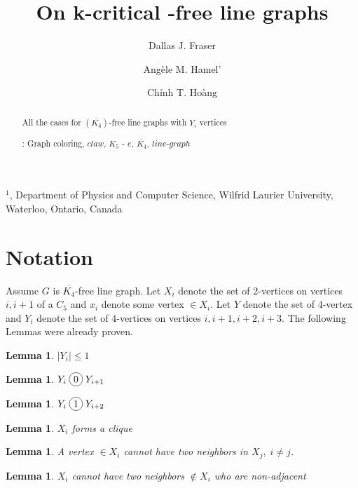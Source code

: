 \documentclass[12pt]{article}
\title{On k-critical {\FAM}-free line graphs}
\author{
	Dallas J. Fraser\inst{1}
	\and Ang\`ele M. Hamel'\inst{1}
	\and Ch\'inh T. Ho\`ang\inst{1}
}
\newcommand*\circled[1]{\tikz[baseline=(char.base)]{
            \node[shape=circle,draw,inner sep=2pt] (char) {#1};}}
\newtheorem{Lemma}[Theorem]{Lemma}
\def\inst#1{$^{#1}$}
\begin{document}
\maketitle

\begin{center}
{\footnotesize

\inst{1}, Department of Physics and Computer Science, Wilfrid Laurier
University, \\Waterloo, Ontario, Canada}

\end{center}

\begin{abstract}
All the cases for $(\overline{K_4})$-free line graphs with $Y_i$ vertices

: Graph coloring, $claw$, $K_5$ - $e$, $\overline{K_4}$, $line$-$graph$ 
\end{abstract}


\section{Notation}\label{sec:intro}
Assume $G$ is $\overline{K_4}$-free line graph. Let $X_i$ denote the set of $2$-vertices on vertices $i,i+1$ of a $C_5$ and $x_i$ denote some vertex $\in X_i$. Let $Y$ denote the set of $4$-vertex and $Y_i$ denote the set of $4$-vertices on vertices $i, i+1,i+2,i+3$. The following Lemmas were already proven.

\begin{Lemma}\label{lem:c5-4vertex-bounded}
$|Y_i| \leq 1$
\end{Lemma}

\begin{Lemma}\label{lem:yi-cojoin-yi1}
$Y_i \;\circled{0}\; Y_{i+1}$
\end{Lemma}

\begin{Lemma}\label{lem:yi-join-yi2}
$Y_i \;\circled{1}\; Y_{i+2}$
\end{Lemma}

\begin{Lemma}\label{lem:xi-clique}
$X_i$ forms a clique
\end{Lemma}

\begin{Lemma}\label{lem:2xi-cojoins-xj}
A vertex $\in X_i$ cannot have two neighbors in $X_j,\; i \neq j$.
\end{Lemma}

\begin{Lemma}\label{lem:xi-neighbor-adjacent}
$X_i$ cannot have two neighbors $\not \in X_i$ who are non-adjacent
\end{Lemma}
\end{document}
